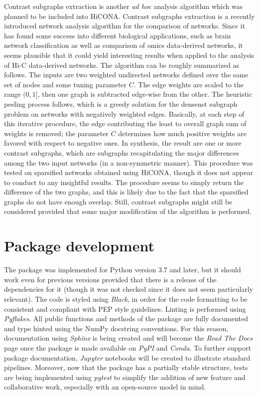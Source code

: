 Contrast subgraphs extraction is another \textit{ad hoc} analysis algorithm which was planned to be included into HiCONA. Contrast subgraphs extraction is a recently introduced network analysis algorithm for the comparison of networks. Since it has found some success into different biological applications, such as brain network classification as well as comparison of omics data-derived networks\cite{contrast2020, contrast2023}, it seems plausible that it could yield interesting results when applied to the analysis of Hi-C data-derived networks. The algorithm can be roughly summarized as follows. The inputs are two weighted undirected networks defined over the same set of nodes and some tuning parameter $C$. The edge weights are scaled to the range $(0,1]$, then one graph is subtracted edge-wise from the other. The heuristic peeling process follows, which is a greedy solution for the densenst subgraph problem on networks with negatively weighted edges. Basically, at each step of this iterative procedure, the edge contributing the least to overall graph sum of weights is removed; the parameter $C$ determines how much positive weights are favored with respect to negative ones. In synthesis, the result are one or more contrast subgraphs, which are subgraphs recapitulating the major differences among the two input networks (in a non-symmetric manner). This procedure was tested on sparsified networks obtained using HiCONA, though it does not appear to conduct to any insightful results. The procedure seems to simply return the difference of the two graphs, and this is likely due to the fact that the sparsified graphs do not have enough overlap. Still, contrast subgraphs might still be considered provided that some major modification of the algorithm is performed.


\section{Package development}

The package was implemented for Python version 3.7 and later, but it should work even for previous versions provided that there is a release of the dependencies for it (though it was not checked since it does not seem particularly relevant). 
The code is styled using \textit{Black}\cite{black2023}, in order for the code formatting to be consistent and compliant with PEP style guidelines\cite{pep2023}. Linting is performed using \textit{Pyflakes}\cite{pyflakes2023}.
All public functions and methods of the package are fully documented and type hinted using the NumPy docstring conventions. For this reason, documentation using \textit{Sphinx}\cite{sphinx2023} is being created and will become the \textit{Read The Docs} page once the package is made available on \textit{PyPI} and \textit{Conda}.
To further support package documentation, \textit{Jupyter}\cite{jupyter2023} notebooks will be created to illustrate standard pipelines. Moreover, now that the package has a partially stable structure, tests are being implemented using \textit{pytest}\cite{pytest2023} to simplify the addition of new feature and collaborative work, especially with an open-source model in mind.

